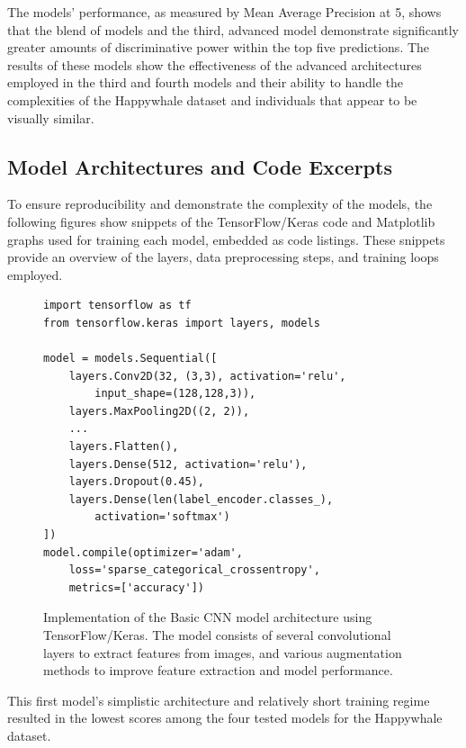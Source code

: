 \documentclass[twocolumn]{article}
\begin{document}
The models’ performance, as measured by Mean Average Precision at 5, shows that the blend of models and the third, advanced model demonstrate significantly greater amounts of discriminative power within the top five predictions. The results of these models show the effectiveness of the advanced architectures employed in the third and fourth models and their ability to handle the complexities of the Happywhale dataset and individuals that appear to be visually similar.

\subsection{Model Architectures and Code Excerpts}

To ensure reproducibility and demonstrate the complexity of the models, the following figures show snippets of the TensorFlow/Keras code and Matplotlib graphs used for training each model, embedded as code listings. These snippets provide an overview of the layers, data preprocessing steps, and training loops employed.

\lstset{
    language=Python,
    basicstyle=\footnotesize\ttfamily,
    breaklines=true,
    columns=fullflexible,
    frame=single
}

\begin{figure}[H]
\centering
\begin{minipage}{0.95\linewidth}
\begin{lstlisting}
import tensorflow as tf
from tensorflow.keras import layers, models

model = models.Sequential([
    layers.Conv2D(32, (3,3), activation='relu',
        input_shape=(128,128,3)),
    layers.MaxPooling2D((2, 2)),
    ...
    layers.Flatten(),
    layers.Dense(512, activation='relu'),
    layers.Dropout(0.45),
    layers.Dense(len(label_encoder.classes_),
        activation='softmax')
])
model.compile(optimizer='adam', 
    loss='sparse_categorical_crossentropy', 
    metrics=['accuracy'])
\end{lstlisting}
\end{minipage}
\caption{Implementation of the Basic CNN model architecture using TensorFlow/Keras. The model consists of several convolutional layers to extract features from images, and various augmentation methods to improve feature extraction and model performance.}
\label{fig:model1}
\end{figure}

This first model’s simplistic architecture and relatively short training regime resulted in the lowest scores among the four tested models for the Happywhale dataset.
\end{document}
